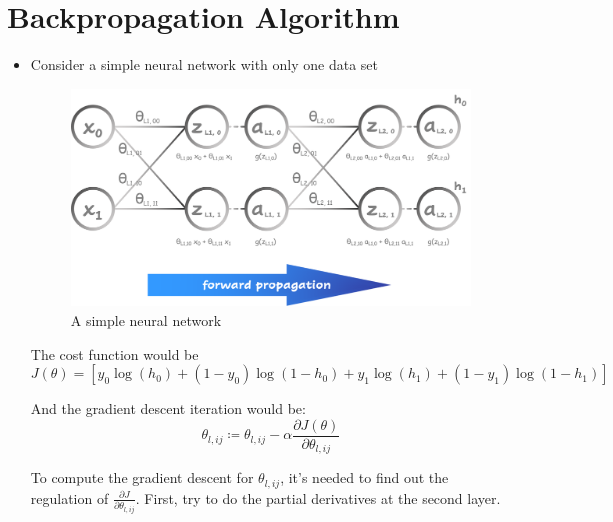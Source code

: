 \section{Backpropagation Algorithm}
\begin{itemize}
    \item Consider a simple neural network with only one data set
    \begin{figure}[H]
        \centering
        \includegraphics[width=4.8in]{./images/neural_network_forward.png}
        \caption{A simple neural network}
    \end{figure}
    
    The cost function would be
    \begin{equation}
        J(\theta) = \left[ 
                        y_0 \log\left(h_0\right) + \left(1 - y_0 \right) \log\left(1 - h_0\right) + 
                        y_1 \log\left(h_1\right) + \left(1 - y_1 \right) \log\left(1 - h_1\right) 
                    \right]
    \end{equation}

    And the gradient descent iteration would be:
    \begin{equation}
        \theta_{l, ij} \coloneqq \theta_{l, ij} - \alpha\frac{\partial J(\theta)}{\partial \theta_{l, ij}} 
    \end{equation}
    
    To compute the gradient descent for $\theta_{l, ij}$, it's needed to find out the regulation of $\frac{\partial J}{\partial \theta_{l,ij}}$.
    First, try to do the partial derivatives at the second layer.
    

\end{itemize}
